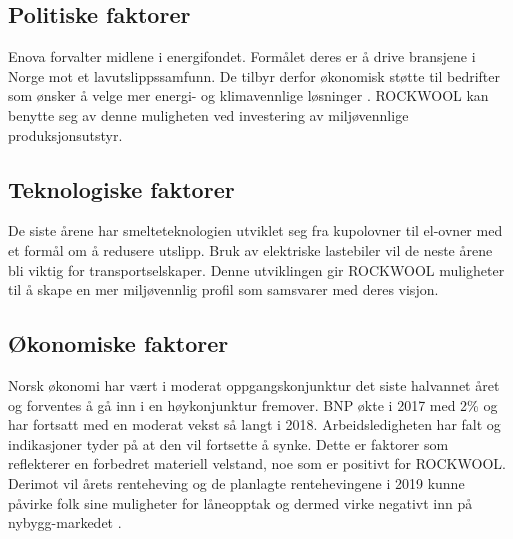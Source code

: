 \begin{table}[ht]
\centering
{}
\caption{Makrofaktorer}
\label{Makrofaktorer}
\end{table}

\subsection{Politiske faktorer}
Enova forvalter midlene i energifondet. Formålet deres er å drive bransjene i Norge mot et lavutslippssamfunn. De tilbyr derfor økonomisk støtte til bedrifter som ønsker å velge mer energi- og klimavennlige løsninger \cite{Enova}. ROCKWOOL kan benytte seg av denne muligheten ved investering av miljøvennlige produksjonsutstyr.

\subsection{Teknologiske faktorer}
De siste årene har smelteteknologien utviklet seg fra kupolovner til el-ovner med et formål om å redusere utslipp. Bruk av elektriske lastebiler vil de neste årene bli viktig for transportselskaper. Denne utviklingen gir ROCKWOOL muligheter til å skape en mer miljøvennlig profil som samsvarer med deres visjon.

\subsection{Økonomiske faktorer}
Norsk økonomi har vært i moderat oppgangskonjunktur det siste halvannet året og forventes å gå inn i en høykonjunktur fremover. BNP økte i 2017 med 2\% og har fortsatt med en moderat vekst så langt i 2018. Arbeidsledigheten har falt og indikasjoner tyder på at den vil fortsette å synke. Dette er faktorer som reflekterer en forbedret materiell velstand, noe som er positivt for ROCKWOOL. Derimot vil årets renteheving og de planlagte rentehevingene i 2019 kunne påvirke folk sine muligheter for låneopptak og dermed virke negativt inn på nybygg-markedet \cite{SSB}.

